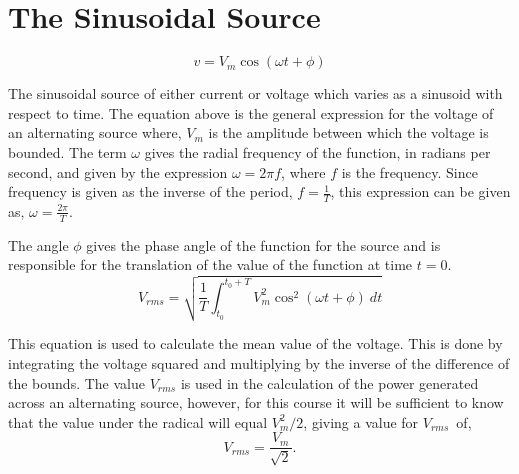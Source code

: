 \documentclass[12pt]{article}
\begin{document}
    \section*{The Sinusoidal Source}
    \[
        v = V_m \cos (\omega t + \phi)
    \]
    \par The sinusoidal source of either current or voltage which varies as a
    sinusoid with respect to time. The equation above is the general expression
    for the voltage of an alternating source where, $V_m$ is the amplitude
    between which the voltage is bounded. The term $\omega$ gives the radial
    frequency of the function, in radians per second, and given by the
    expression $\omega = 2\pi f$, where $f$ is the frequency. Since frequency is
    given as the inverse of the period, $f = \frac{1}{T}$, this expression can
    be given as, $\omega = \frac{2\pi}{T}$.
    \par The angle $\phi$ gives the phase angle of the function for the source
    and is responsible for the translation of the value of the function at time
    $t = 0$.
    \[
        V_{rms} = \sqrt{\frac{1}{T} \int_{t_0}^{t_0+T} V_m^2 \cos^2 (\omega t +
        \phi)\ dt}
    \]
    \par This equation is used to calculate the mean value of the voltage. This
    is done by integrating the voltage squared and multiplying by the inverse of
    the difference of the bounds. The value $V_{rms}$ is used in the calculation
    of the power generated across an alternating source, however, for this
    course it will be sufficient to know that the value under the radical will
    equal $V_m^2 / 2$, giving a value for $V_{rms}$ of,
    \[
        V_{rms} = \frac{V_m}{\sqrt{2}}
    .\]
\end{document}
